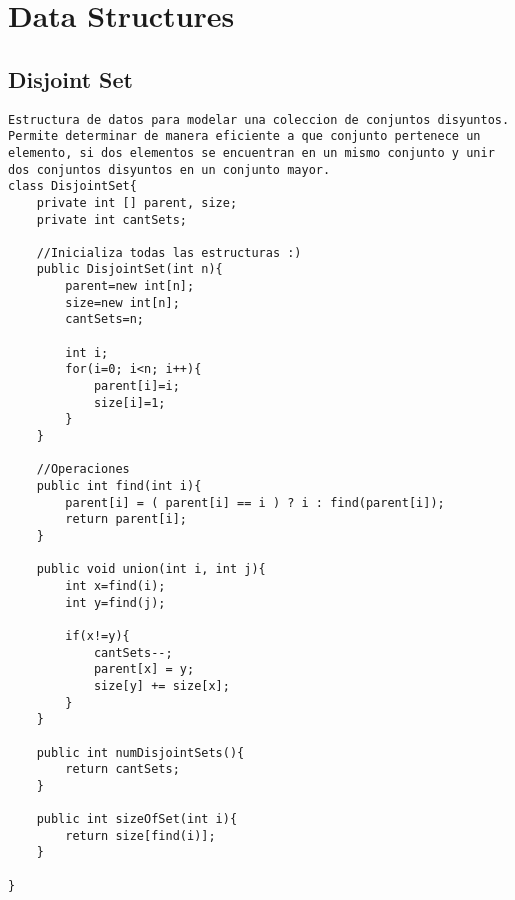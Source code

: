 \documentclass[10pt,letterpaper,twocolumn,twosided]{article}
\begin{document}
\section{Data Structures}

\subsection{Disjoint Set}
\begin{lstlisting}
Estructura de datos para modelar una coleccion de conjuntos disyuntos. Permite determinar de manera eficiente a que conjunto pertenece un elemento, si dos elementos se encuentran en un mismo conjunto y unir dos conjuntos disyuntos en un conjunto mayor.
class DisjointSet{
	private int [] parent, size;
	private int cantSets;

	//Inicializa todas las estructuras :)
	public DisjointSet(int n){
		parent=new int[n];
		size=new int[n];
		cantSets=n;

		int i;
		for(i=0; i<n; i++){
			parent[i]=i;
			size[i]=1;
		}
	}

	//Operaciones
	public int find(int i){
		parent[i] = ( parent[i] == i ) ? i : find(parent[i]);
    	return parent[i];
	}

	public void union(int i, int j){
		int x=find(i);
		int y=find(j);

		if(x!=y){
			cantSets--;
			parent[x] = y;
			size[y] += size[x];
		}
	}

	public int numDisjointSets(){
		return cantSets;
	}

	public int sizeOfSet(int i){
		return size[find(i)];
	}
	
}\end{lstlisting}
\end{document}
